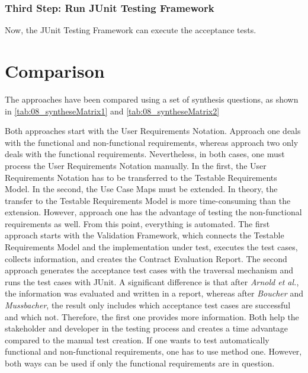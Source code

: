 

\subsubsection{Third Step: Run JUnit Testing Framework}
Now, the JUnit Testing Framework can execute the acceptance tests.
\newpage
\section{Comparison}
\label{topic08:sectionComparison}

The approaches have been compared using a set of synthesis questions, as shown in \autoref{tab:08_syntheseMatrix1} and \autoref{tab:08_syntheseMatrix2}

Both approaches start with the User Requirements Notation. Approach one deals with the functional and non-functional requirements, whereas approach two only deals with the functional requirements. Nevertheless, in both cases, one must process the User Requirements Notation manually. In the first, the User Requirements Notation has to be transferred to the Testable Requirements Model. In the second, the Use Case Maps must be extended. In theory, the transfer to the Testable Requirements Model is more time-consuming than the extension. However, approach one has the advantage of testing the non-functional requirements as well. From this point, everything is automated. The first approach starts with the Validation Framework, which connects the Testable Requirements Model and the implementation under test, executes the test cases, collects information, and creates the Contract Evaluation Report. The second approach generates the acceptance test cases with the traversal mechanism and runs the test cases with JUnit. A significant difference is that after \textit{Arnold et al.}, the information was evaluated and written in a report, whereas after \textit{Boucher} and \textit{Mussbacher}, the result only includes which acceptance test cases are successful and which not. Therefore, the first one provides more information. Both help the stakeholder and developer in the testing process and creates a time advantage compared to the manual test creation. If one wants to test automatically functional and non-functional requirements, one has to use method one. However, both ways can be used if only the functional requirements are in question.

